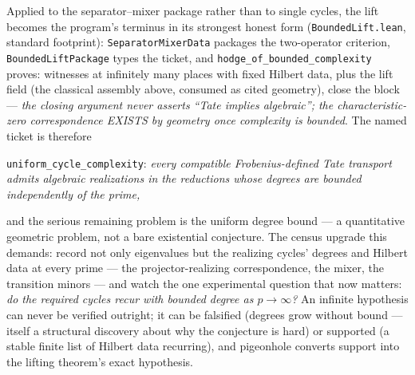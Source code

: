 \documentclass[11pt]{article}
\theoremstyle{definition}
\theoremstyle{remark}
\begin{document}
Applied to the separator--mixer package rather than to single cycles,
the lift becomes the program's terminus in its strongest honest form
(\texttt{BoundedLift.lean}, standard footprint):
\texttt{SeparatorMixerData} packages the two-operator criterion,
\texttt{BoundedLiftPackage} types the ticket, and
\texttt{hodge\_of\_bounded\_complexity} proves: witnesses at
infinitely many places with fixed Hilbert data, plus the lift field
(the classical assembly above, consumed as cited geometry), close the
block --- \emph{the closing argument never asserts ``Tate implies
algebraic''; the characteristic-zero correspondence EXISTS by
geometry once complexity is bounded}.  The named ticket is therefore
\begin{center}
\texttt{uniform\_cycle\_complexity}: \emph{every compatible
Frobenius-defined Tate transport admits algebraic realizations in
the reductions whose degrees are bounded independently of the
prime,}
\end{center}
and the serious remaining problem is the uniform degree bound --- a
quantitative geometric problem, not a bare existential conjecture.
The census upgrade this demands: record not only eigenvalues but the
realizing cycles' degrees and Hilbert data at every prime --- the
projector-realizing correspondence, the mixer, the transition minors
--- and watch the one experimental question that now matters:
\emph{do the required cycles recur with bounded degree as
$p\to\infty$?}  An infinite hypothesis can never be verified
outright; it can be falsified (degrees grow without bound --- itself
a structural discovery about why the conjecture is hard) or
supported (a stable finite list of Hilbert data recurring), and
pigeonhole converts support into the lifting theorem's exact
hypothesis.
\end{document}
